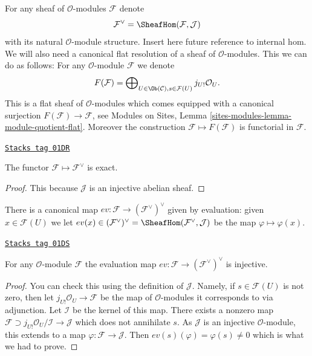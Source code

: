 \medskip\noindent
For any sheaf of $\mathcal{O}$-modules $\mathcal{F}$ denote
$$
\mathcal{F}^\vee
=
\SheafHom(\mathcal{F}, \mathcal{J})
$$
with its natural $\mathcal{O}$-module structure.
Insert here future reference to internal hom.
We will also need
a canonical flat resolution of a sheaf of $\mathcal{O}$-modules.
This we can do as follows: For any $\mathcal{O}$-module
$\mathcal{F}$ we denote
$$
F(\mathcal{F})
=
\bigoplus\nolimits_{U \in \Ob(\mathcal{C}), s \in \mathcal{F}(U)}
j_{U!}\mathcal{O}_U.
$$
This is a flat sheaf of $\mathcal{O}$-modules which comes equipped
with a canonical surjection $F(\mathcal{F}) \to \mathcal{F}$, see
Modules on Sites, Lemma \ref{sites-modules-lemma-module-quotient-flat}.
Moreover the construction $\mathcal{F} \mapsto F(\mathcal{F})$
is functorial in $\mathcal{F}$.

\begin{lemma}
\label{injectives-lemma-vee-exact-sheaves}
\href{https://stacks.math.columbia.edu/tag/01DR}{\texttt{Stacks tag 01DR}}

The functor $\mathcal{F} \mapsto \mathcal{F}^\vee$ is exact.
\end{lemma}

\begin{proof}
This because $\mathcal{J}$ is an injective abelian sheaf.
\end{proof}

There is a canonical map $ev : \mathcal{F} \to (\mathcal{F}^\vee)^\vee$
given by evaluation: given $x \in \mathcal{F}(U)$ we let
$ev(x) \in (\mathcal{F}^\vee)^\vee =
\SheafHom(\mathcal{F}^\vee, \mathcal{J})$
be the map $\varphi \mapsto \varphi(x)$.

\begin{lemma}
\label{injectives-lemma-ev-injective-sheaves}
\href{https://stacks.math.columbia.edu/tag/01DS}{\texttt{Stacks tag 01DS}}

For any $\mathcal{O}$-module $\mathcal{F}$ the evaluation map
$ev : \mathcal{F} \to (\mathcal{F}^\vee)^\vee$ is injective.
\end{lemma}

\begin{proof}
You can check this using the definition of $\mathcal{J}$.
Namely, if $s \in \mathcal{F}(U)$ is not zero, then let
$j_{U!}\mathcal{O}_U \to \mathcal{F}$ be the map of
$\mathcal{O}$-modules it corresponds to via adjunction.
Let $\mathcal{I}$ be the kernel of this map. There exists
a nonzero map $\mathcal{F} \supset j_{U!}\mathcal{O}_U/\mathcal{I}
\to \mathcal{J}$ which does not annihilate $s$. As $\mathcal{J}$ is
an injective $\mathcal{O}$-module, this extends to a map
$\varphi : \mathcal{F} \to \mathcal{J}$.
Then $ev(s)(\varphi) = \varphi(s) \not = 0$ which is what we had to prove.
\end{proof}

